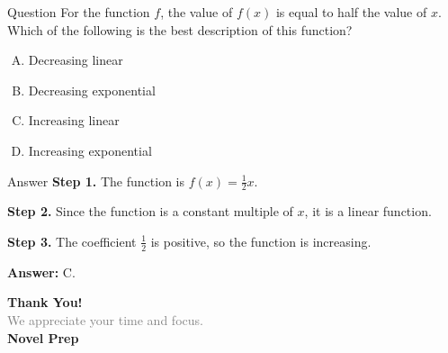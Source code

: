 \documentclass{beamer}
\begin{document}
\begin{frame}{Question}
For the function $f$, the value of $f(x)$ is equal to half the value of $x$. Which of the following is the best description of this function?

\begin{enumerate}[A.]
    \item Decreasing linear
    \item Decreasing exponential
    \item Increasing linear
    \item Increasing exponential
\end{enumerate}
\end{frame}



\begin{frame}{Answer}
\textbf{Step 1.} The function is $f(x) = \frac{1}{2}x$.

\textbf{Step 2.} Since the function is a constant multiple of $x$, it is a linear function.

\textbf{Step 3.} The coefficient $\frac{1}{2}$ is positive, so the function is increasing.

\textbf{Answer:} C.
\end{frame}







\begin{frame}{}

    \centering
    \vspace{5em}

    {\Huge \textbf{\textcolor{novelPurple}{Thank You!}}} \\[1em]
    {\large \textcolor{gray}{We appreciate your time and focus.}} \\[3em]

    {\LARGE \textbf{\textcolor{novelPurple}{\textsf{Novel Prep}}}}

    \vfill
\end{frame}
\end{document}
